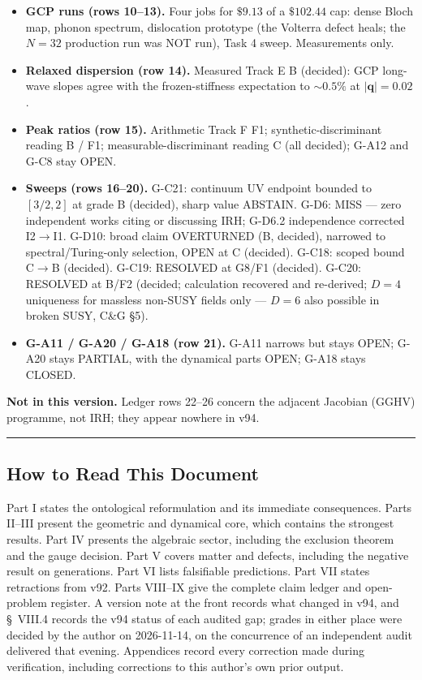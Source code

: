 \documentclass[a4paper,11pt]{article}
\begin{document}
\begin{itemize}
\item \textbf{GCP runs (rows 10--13).} Four jobs for $\$9.13$ of a $\$102.44$ cap: dense Bloch map, phonon spectrum, dislocation prototype (the Volterra defect heals; the $N=32$ production run was NOT run), Task 4 sweep. Measurements only.
\item \textbf{Relaxed dispersion (row 14).} Measured Track E B (decided): GCP long-wave slopes agree with the frozen-stiffness expectation to $\sim0.5\%$ at $|\mathbf{q}|=0.02$.
\item \textbf{Peak ratios (row 15).} Arithmetic Track F F1; synthetic-discriminant reading B / F1; measurable-discriminant reading C (all decided); G-A12 and G-C8 stay OPEN.
\item \textbf{Sweeps (rows 16--20).} G-C21: continuum UV endpoint bounded to $[3/2,2]$ at grade B (decided), sharp value ABSTAIN. G-D6: MISS --- zero independent works citing or discussing IRH; G-D6.2 independence corrected I2$\to$I1. G-D10: broad claim OVERTURNED (B, decided), narrowed to spectral/Turing-only selection, OPEN at C (decided). G-C18: scoped bound C$\to$B (decided). G-C19: RESOLVED at G8/F1 (decided). G-C20: RESOLVED at B/F2 (decided; calculation recovered and re-derived; $D=4$ uniqueness for massless non-SUSY fields only --- $D=6$ also possible in broken SUSY, C\&G \S5).
\item \textbf{G-A11 / G-A20 / G-A18 (row 21).} G-A11 narrows but stays OPEN; G-A20 stays PARTIAL, with the dynamical parts OPEN; G-A18 stays CLOSED.
\end{itemize}

\textbf{Not in this version.} Ledger rows 22--26 concern the adjacent Jacobian (GGHV) programme, not IRH; they appear nowhere in v94.

\medskip\hrule\medskip

\subsection*{How to Read This Document}

Part I states the ontological reformulation and its immediate consequences. Parts II–III present the geometric and dynamical core, which contains the strongest results. Part IV presents the algebraic sector, including the exclusion theorem and the gauge decision. Part V covers matter and defects, including the negative result on generations. Part VI lists falsifiable predictions. Part VII states retractions from v92. Parts VIII–IX give the complete claim ledger and open-problem register. A version note at the front records what changed in v94, and \S~VIII.4 records the v94 status of each audited gap; grades in either place were decided by the author on 2026-11-14, on the concurrence of an independent audit delivered that evening. Appendices record every correction made during verification, including corrections to this author's own prior output.
\end{document}
